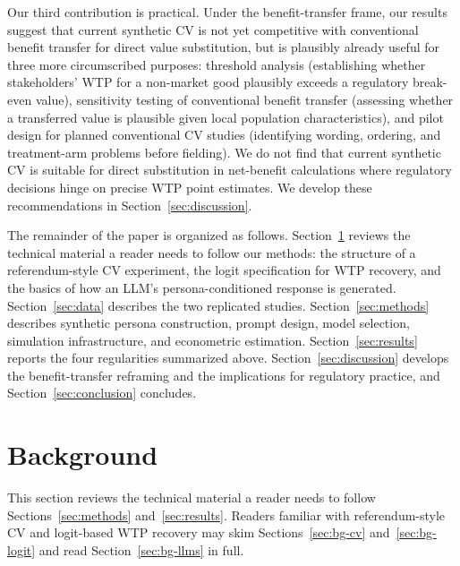 \documentclass[12pt]{article}
\begin{document}
Our third contribution is practical. Under the benefit-transfer frame, our
results suggest that current synthetic CV is not yet competitive with
conventional benefit transfer for direct value substitution, but is
plausibly already useful for three more circumscribed purposes: threshold
analysis (establishing whether stakeholders' WTP for a non-market good
plausibly exceeds a regulatory break-even value), sensitivity testing of
conventional benefit transfer (assessing whether a transferred value is
plausible given local population characteristics), and pilot design for
planned conventional CV studies (identifying wording, ordering, and
treatment-arm problems before fielding). We do not find that current
synthetic CV is suitable for direct substitution in net-benefit calculations
where regulatory decisions hinge on precise WTP point estimates. We develop
these recommendations in Section~\ref{sec:discussion}.

The remainder of the paper is organized as follows.
Section~\ref{sec:background} reviews the technical material a reader needs
to follow our methods: the structure of a referendum-style CV experiment,
the logit specification for WTP recovery, and the basics of how an LLM's
persona-conditioned response is generated. Section~\ref{sec:data} describes
the two replicated studies. Section~\ref{sec:methods} describes synthetic
persona construction, prompt design, model selection, simulation
infrastructure, and econometric estimation. Section~\ref{sec:results}
reports the four regularities summarized above. Section~\ref{sec:discussion}
develops the benefit-transfer reframing and the implications for regulatory
practice, and Section~\ref{sec:conclusion} concludes.

%

\section{Background}\label{sec:background}

This section reviews the technical material a reader needs to follow
Sections~\ref{sec:methods} and~\ref{sec:results}. Readers familiar with
referendum-style CV and logit-based WTP recovery may skim
Sections~\ref{sec:bg-cv} and~\ref{sec:bg-logit} and read
Section~\ref{sec:bg-llms} in full.
\end{document}
